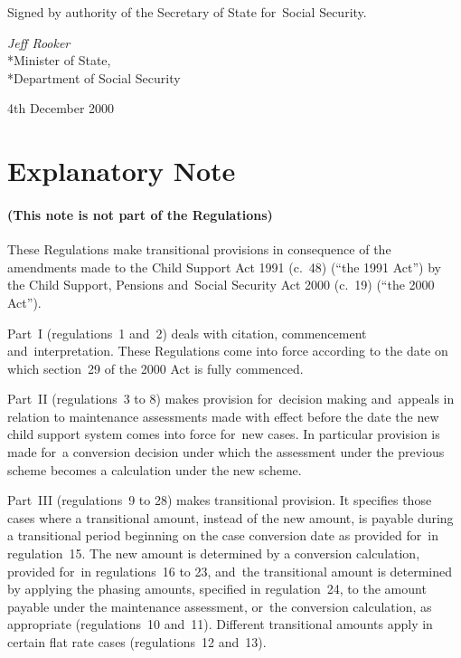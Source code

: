 \documentclass[12pt,a4paper]{article}
\begin{document}

\bigskip

Signed 
by authority of the Secretary of State for~Social Security.

{\raggedleft
\emph{Jeff Rooker}\\*Minister of State,\\*Department of Social Security

}

4th December 2000

\small

\part{Explanatory Note}

\renewcommand\parthead{--- Explanatory Note}

\subsection*{(This note is not part of the Regulations)}

These Regulations make transitional provisions in consequence of the amendments made to the Child Support Act 1991 (c.\ 48) (“the 1991 Act”) by the Child Support, Pensions and~Social Security Act 2000 (c.\ 19) (“the 2000 Act”).

Part~I (regulations~1 and~2) deals with citation, commencement and~interpretation. These Regulations come into force according to the date on which section~29 of the 2000 Act is fully commenced.

Part~II (regulations~3 to 8) makes provision for~decision making and~appeals in relation to maintenance assessments made with effect before the date the new child support system comes into force for~new cases. In particular provision is made for~a conversion decision under which the assessment under the previous scheme becomes a calculation under the new scheme.

Part~III (regulations~9 to 28) makes transitional provision. It specifies those cases where a transitional amount, instead of the new amount, is payable during a transitional period beginning on the case conversion date as provided for~in regulation~15. The new amount is determined by a conversion calculation, provided for~in regulations~16 to 23, and~the transitional amount is determined by applying the phasing amounts, specified in regulation~24, to the amount payable under the maintenance assessment, or~the conversion calculation, as appropriate (regulations~10 and~11). Different transitional amounts apply in certain flat rate cases (regulations~12 and~13).
\end{document}
